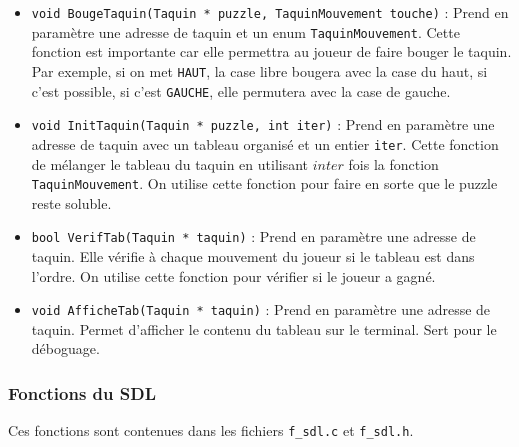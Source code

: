 \documentclass[11pt]{article}
\begin{document}
\begin{itemize}
\item \texttt{void BougeTaquin(Taquin * puzzle, TaquinMouvement touche)} : Prend en paramètre une adresse de taquin et un enum \texttt{TaquinMouvement}. Cette fonction est importante car elle permettra au joueur de faire bouger le taquin. Par exemple, si on met \texttt{HAUT}, la case libre bougera avec la case du haut, si c'est possible, si c'est \texttt{GAUCHE}, elle permutera avec la case de gauche.
\item \texttt{void InitTaquin(Taquin * puzzle, int iter)} : Prend en paramètre une adresse de taquin avec un tableau organisé et un entier \texttt{iter}. Cette fonction de mélanger le tableau du taquin en utilisant \(inter\) fois la fonction \texttt{TaquinMouvement}. On utilise cette fonction pour faire en sorte que le puzzle reste soluble.
\item \texttt{bool VerifTab(Taquin * taquin)} : Prend en paramètre une adresse de taquin. Elle vérifie à chaque mouvement du joueur si le tableau est dans l'ordre. On utilise cette fonction pour vérifier si le joueur a gagné.
\item \texttt{void AfficheTab(Taquin * taquin)} : Prend en paramètre une adresse de taquin. Permet d'afficher le contenu du tableau sur le terminal. Sert pour le déboguage.
\end{itemize}

\subsubsection{Fonctions du SDL}
\label{sec:org128447e}

Ces fonctions sont contenues dans les fichiers \texttt{f\_sdl.c} et \texttt{f\_sdl.h}.
\end{document}
